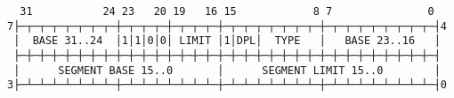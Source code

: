 \documentclass[varwidth=50em]{standalone}
\begin{document}
\begin{verbatim}
  31           24 23   20 19   16 15            8 7               0
7├─┬─┬─┬─┬─┬─┬─┬─┼─┬─┬─┬─┼─┬─┬─┬─┼─┬─┬─┬─┬─┬─┬─┬─┼─┬─┬─┬─┬─┬─┬─┬─┬─┤4
 │  BASE 31..24  │1│1│0│0│ LIMIT │1│DPL│  TYPE   │   BASE 23..16   │
 ├─┼─┼─┼─┼─┼─┼─┼─┼─┼─┼─┼─┼─┼─┼─┼─┼─┼─┼─┼─┼─┼─┼─┼─┼─┼─┼─┼─┼─┼─┼─┼─┼─┤
 │      SEGMENT BASE 15..0       │      SEGMENT LIMIT 15..0        │
3├─┴─┴─┴─┴─┴─┴─┴─┼─┴─┴─┴─┴─┴─┴─┴─┼─┴─┴─┴─┴─┴─┴─┴─┼─┴─┴─┴─┴─┴─┴─┴─┴─┤0
\end{verbatim}
\end{document}
